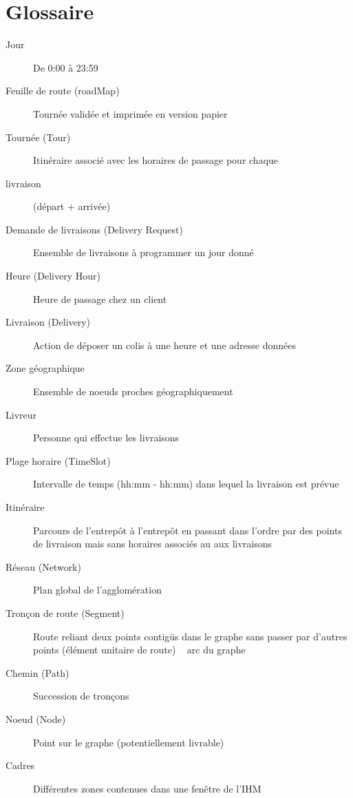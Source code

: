 \chapter*{Glossaire}
\begin{description}
\item [Jour]De 0:00 à 23:59
\item [Feuille de route (roadMap)]Tournée validée et imprimée en version papier
\item [Tournée (Tour)]Itinéraire associé avec les horaires de passage pour chaque \item [livraison] (départ + arrivée)
\item [Demande de livraisons (Delivery Request)] Ensemble de livraisons à programmer un jour donné 
\item [Heure (Delivery Hour)]Heure de passage chez un client
\item [Livraison (Delivery)]Action de déposer un colis à une heure et une adresse données
\item [Zone géographique]Ensemble de noeuds proches géographiquement
\item [Livreur]Personne qui effectue les livraisons
\item [Plage horaire (TimeSlot)] Intervalle de temps (hh:mm - hh:mm)  dans lequel la livraison est prévue
\item [Itinéraire]Parcours de l’entrepôt à l’entrepôt en passant dans l’ordre par des points de livraison mais sans horaires associés au aux livraisons
\item [Réseau (Network)]Plan global de l’agglomération
\item [Tronçon de route (Segment)]Route reliant deux points contigüs dans le graphe sans passer par d’autres points (élément unitaire de route) ~ arc du graphe    
\item [Chemin (Path)]Succession de tronçons
\item [Noeud (Node)]Point sur le graphe (potentiellement livrable)
\item [Cadres]Différentes zones contenues dans une fenêtre de l’IHM
\end{description}